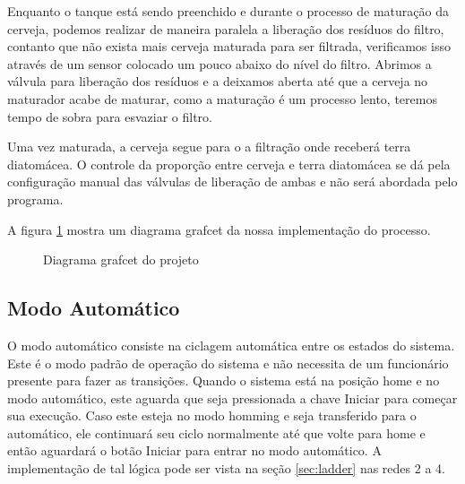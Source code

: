 \documentclass[twoside,twocolumn,12pt]{paper}
\begin{document}
	Enquanto o  tanque está sendo preenchido e durante o processo de maturação da cerveja, podemos realizar de maneira paralela a liberação dos resíduos do filtro, contanto que não exista mais cerveja maturada para ser filtrada, verificamos isso através de um sensor colocado um pouco abaixo do nível do filtro. Abrimos a válvula para liberação dos resíduos e a deixamos aberta até que a cerveja no maturador acabe de maturar, como a maturação é um processo lento, teremos tempo de sobra para esvaziar o filtro.
	
	Uma vez maturada, a cerveja segue para o a filtração onde receberá terra diatomácea. O controle da proporção entre cerveja e terra diatomácea se dá pela configuração manual das válvulas de liberação de ambas e não será abordada pelo programa.
	
	A figura \ref{fig:grafcet} mostra um diagrama grafcet da nossa implementação do processo.
	
	\begin{figure}
		\centering
		\caption{Diagrama grafcet do projeto}
		\label{fig:grafcet}
	\end{figure}
	
	\subsection{Modo Automático}
	O modo automático consiste na ciclagem automática entre os estados do sistema. Este é o modo padrão de operação do sistema e não necessita de um funcionário presente para fazer as transições. Quando o sistema está na posição home e no modo automático, este aguarda que seja pressionada a chave Iniciar para começar sua execução. Caso este esteja no modo homming e seja transferido para o automático, ele continuará seu ciclo normalmente até que volte para home e então aguardará o botão Iniciar para entrar no modo automático. A implementação de tal lógica pode ser vista na seção \ref{sec:ladder} nas redes 2 a 4. 
	
\end{document}
